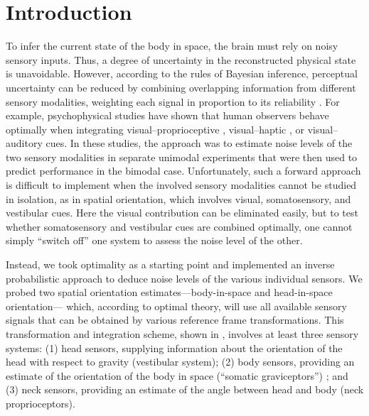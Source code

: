 \newpage


\section{Introduction}

To infer the current state of the body in space, the brain must rely on noisy sensory inputs. Thus, a degree of uncertainty in the reconstructed physical state is unavoidable. However, according to the rules of Bayesian inference, perceptual uncertainty can be reduced by combining overlapping information from different sensory modalities, weighting each signal in proportion to its reliability \cite{knill2004,kording2004,angelaki2008}. For example, psychophysical studies have shown that human observers behave optimally when integrating visual--proprioceptive \cite{vanbeers1999}, visual--haptic \cite{ernst2002}, or visual--auditory \cite{alais2004} cues. In these studies, the approach was to estimate noise levels of the two sensory modalities in separate unimodal experiments that were then used to predict performance in the bimodal case. Unfortunately, such a forward approach is difficult to implement when the involved sensory modalities cannot be studied in isolation, as in spatial orientation, which involves visual, somatosensory, and vestibular cues. Here the visual contribution can be eliminated easily, but to test whether somatosensory and vestibular cues are combined optimally, one cannot simply ``switch off'' one system to assess the noise level of the other. 

Instead, we took optimality as a starting point and implemented an inverse probabilistic approach to deduce noise levels of the various individual sensors. We probed two spatial orientation estimates---body-in-space and head-in-space orientation--- which, according to optimal theory, will use all available sensory signals that can be obtained by various reference frame transformations. This transformation and integration scheme, shown in , involves at least three sensory systems: (1) head sensors, supplying information about the orientation of the head with respect to gravity (vestibular system); (2) body sensors, providing an estimate of the orientation of the body in space (``somatic graviceptors'') \cite{mittelstaedt1997}; and (3) neck sensors, providing an estimate of the angle between head and body (neck proprioceptors). 

